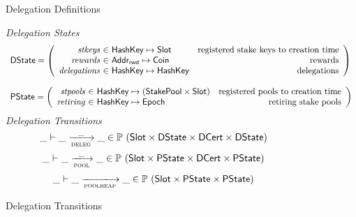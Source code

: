 \begin{figure}
  \caption{Delegation Definitions}
  \label{fig:delegation-definitons}
\end{figure}

\begin{figure}
  \emph{Delegation States}
  \begin{equation*}
    \begin{array}{l}
    \DState =
    \left(\begin{array}{r@{~\in~}lr}
      \var{stkeys} & \HashKey \mapsto \Slot & \text{registered stake keys to creation time}\\
      \var{rewards} & \AddrRWD \mapsto \Coin & \text{rewards}\\
      \var{delegations} & \HashKey \mapsto \HashKey & \text{delegations}\\
    \end{array}\right)
    \\
    \\
    \PState =
    \left(\begin{array}{r@{~\in~}lr}
      \var{stpools} & \HashKey \mapsto (\StakePool \times \Slot) & \text{registered pools to creation time}\\
      \var{retiring} & \HashKey \mapsto \Epoch & \text{retiring stake pools}\\
    \end{array}\right)
    \end{array}
  \end{equation*}
  \emph{Delegation Transitions}
  \begin{equation*}
    \_ \vdash \_ \trans{deleg}{\_} \_ \in
      \powerset (\Slot \times \DState \times \DCert \times \DState)
  \end{equation*}
  \begin{equation*}
    \_ \vdash \_ \trans{pool}{\_} \_ \in
      \powerset (\Slot \times \PState \times \DCert \times \PState)
  \end{equation*}
  \begin{equation*}
    \_ \vdash \_ \trans{poolreap}{} \_ \in
    \powerset (\Slot \times \PState \times \PState)
  \end{equation*}
  \caption{Delegation Transitions}
  \label{fig:delegation-transitions}
\end{figure}

